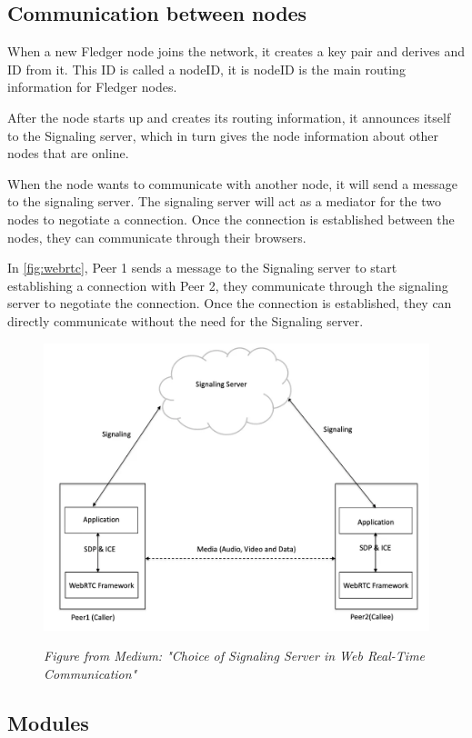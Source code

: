 \documentclass[a4paper,11pt,oneside]{report}
\begin{document}
\subsection{Communication between nodes}

When a new Fledger node joins the network, it creates a key pair and derives and ID from it. This ID is called a nodeID, it is nodeID is the main routing information for Fledger nodes. 

After the node starts up and creates its routing information, it announces itself to the Signaling server, which in turn gives the node information about other nodes that are online.

When the node wants to communicate with another node, it will send a message to the signaling server. The signaling server will act as a mediator for the two nodes to negotiate a connection. Once the connection is established between the nodes, they can communicate through their browsers.

In \autoref{fig:webrtc}, Peer 1 sends a message to the Signaling server to start establishing a connection with Peer 2, they communicate through the signaling server to negotiate the connection. Once the connection is established, they can directly communicate without the need for the Signaling server. 

\begin{figure}[H]
    \centering
    \includegraphics[width=0.8\linewidth]{plots/webrtc.png}
    \caption{}
    \label{fig:webrtc}
    \small\textit{Figure from Medium: "Choice of Signaling Server in Web Real-Time Communication"~\cite{medium}}
\end{figure}

\subsection{Modules}
\label{sec:fledger_modules}
\end{document}
